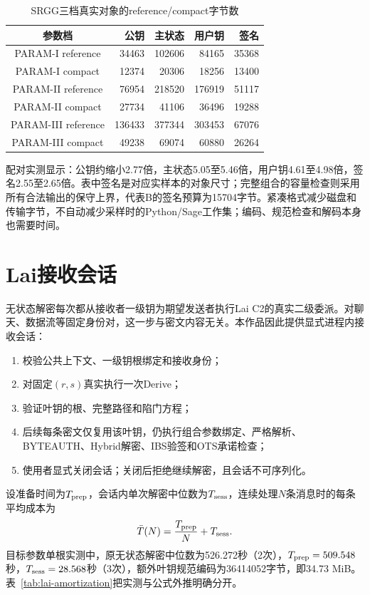 \documentclass[UTF8,a4paper,12pt,oneside,openany,fontset=fandol]{ctexrep}
\begin{document}
\begin{table}[htbp]
\centering
\small
\caption{SRGG三档真实对象的reference/compact字节数}
\label{tab:srgg-compact-sizes}
\begin{tabular}{@{}crrrr@{}}
\toprule
\rowcolor{black!8} 参数档 & 公钥 & 主状态 & 用户钥 & 签名 \\
\midrule
PARAM-I reference & 34463 & 102606 & 84165 & 35368 \\
PARAM-I compact & 12374 & 20306 & 18256 & 13400 \\
PARAM-II reference & 76954 & 218520 & 176919 & 51117 \\
PARAM-II compact & 27734 & 41106 & 36496 & 19288 \\
PARAM-III reference & 136433 & 377344 & 303453 & 67076 \\
PARAM-III compact & 49238 & 69074 & 60880 & 26264 \\
\bottomrule
\end{tabular}
\end{table}

配对实测显示：公钥约缩小2.77倍，主状态5.05至5.46倍，用户钥4.61至4.98倍，签名2.55至2.65倍。表中签名是对应实样本的对象尺寸；完整组合的容量检查则采用所有合法输出的保守上界，代表B的签名预算为15704字节。紧凑格式减少磁盘和传输字节，不自动减少采样时的Python/Sage工作集；编码、规范检查和解码本身也需要时间。

\section{Lai接收会话}
无状态解密每次都从接收者一级钥为期望发送者执行Lai C2的真实二级委派。对聊天、数据流等固定身份对，这一步与密文内容无关。本作品因此提供显式进程内接收会话：

\begin{enumerate}
  \item 校验公共上下文、一级钥根绑定和接收身份；
  \item 对固定$(r,s)$真实执行一次Derive；
  \item 验证叶钥的根、完整路径和陷门方程；
  \item 后续每条密文仅复用该叶钥，仍执行组合参数绑定、严格解析、BYTEAUTH、Hybrid解密、IBS验签和OTS承诺检查；
  \item 使用者显式关闭会话；关闭后拒绝继续解密，且会话不可序列化。
\end{enumerate}

设准备时间为$T_{\rm prep}$，会话内单次解密中位数为$T_{\rm sess}$，连续处理$N$条消息时的每条平均成本为
\[
  \bar T(N)=\frac{T_{\rm prep}}{N}+T_{\rm sess}.
\]
目标参数单根实测中，原无状态解密中位数为526.272秒（2次），$T_{\rm prep}=509.548$秒，$T_{\rm sess}=28.568$秒（3次），额外叶钥规范编码为36414052字节，即34.73 MiB。表~\ref{tab:lai-amortization}把实测与公式外推明确分开。
\end{document}
